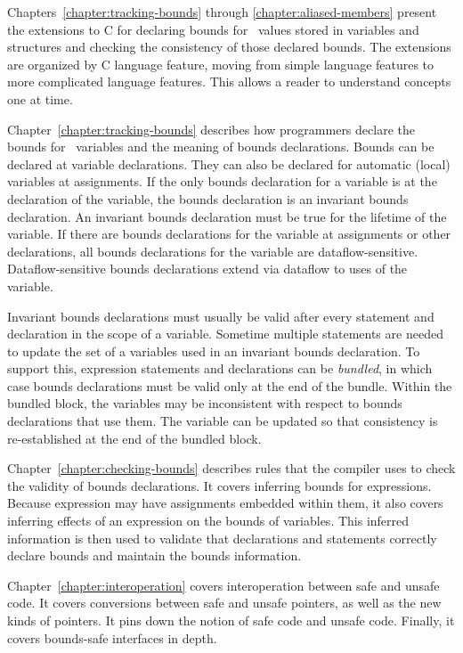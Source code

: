Chapters~\ref{chapter:tracking-bounds} through \ref{chapter:aliased-members}
present the extensions to C for declaring bounds
for \arrayptr\ values stored in variables and structures and
checking the consistency of those declared bounds. The extensions are
organized by C language feature, moving from simple language features to
more complicated language features. This allows a reader to understand
concepts one at time.

Chapter~\ref{chapter:tracking-bounds} describes how programmers declare the bounds for
\arrayptr\ variables and the meaning of bounds declarations.
Bounds can be declared at variable declarations. They can also be
declared for automatic (local) variables at assignments. If the only
bounds declaration for a variable is at the declaration of the variable,
the bounds declaration is an invariant bounds declaration. An invariant
bounds declaration must be true for the lifetime of the variable. If
there are bounds declarations for the variable at assignments or other
declarations, all bounds declarations for the variable are
dataflow-sensitive. Dataflow-sensitive bounds declarations extend via
dataflow to uses of the variable.

Invariant bounds declarations must usually be valid after every
statement and declaration in the scope of a variable. Sometime multiple
statements are needed to update the set of a variables used in an
invariant bounds declaration. To support this, expression statements and
declarations can be \emph{bundled}, in which case bounds declarations
must be valid only at the end of the bundle. Within the bundled block,
the variables may be inconsistent with respect to bounds declarations
that use them. The variable can be updated so that consistency is
re-established at the end of the bundled block.

Chapter~\ref{chapter:checking-bounds} describes rules that the compiler uses to check the validity
of bounds declarations. It covers inferring bounds for expressions.
Because expression may have assignments embedded within them, it also
covers inferring effects of an expression on the bounds of variables.
This inferred information is then used to validate that declarations and
statements correctly declare bounds and maintain the bounds information.

Chapter~\ref{chapter:interoperation} covers interoperation between 
safe and unsafe code. It covers
conversions between safe and unsafe pointers, as well as the new kinds
of pointers. It pins down the notion of safe code and unsafe code.
Finally, it covers bounds-safe interfaces in depth.

